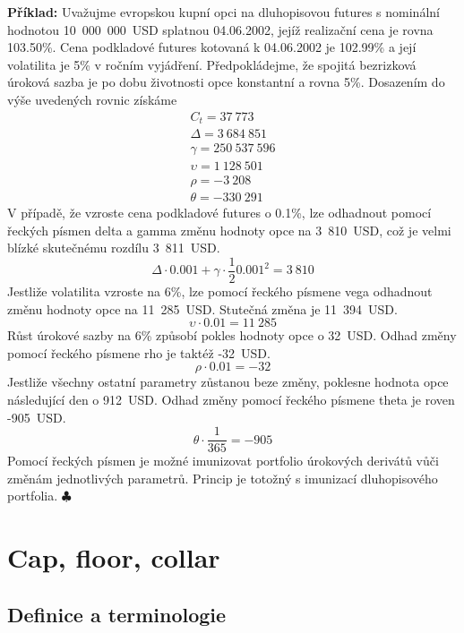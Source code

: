 \documentclass[a4paper]{book}
\begin{document}
\noindent \textbf{Příklad:} Uvažujme evropskou kupní opci na dluhopisovou futures s nominální hodnotou 10~000~000~USD splatnou 04.06.2002, jejíž realizační cena je rovna 103.50\%. Cena podkladové futures kotovaná k 04.06.2002 je 102.99\% a její volatilita je 5\% v ročním vyjádření. Předpokládejme, že spojitá bezrizková úroková sazba je po dobu životnosti opce konstantní a rovna 5\%. Dosazením do výše uvedených rovnic získáme
\begin{gather*}
C_t = 37~773\\
\Delta = 3~684~851\\
\gamma = 250~537~596\\
\upsilon = 1~128~501\\
\rho = -3~208\\
\theta = -330~291
\end{gather*}
V případě, že vzroste cena podkladové futures o 0.1\%, lze odhadnout pomocí řeckých písmen delta a gamma změnu hodnoty opce na 3~810~USD, což je velmi blízké skutečnému rozdílu 3~811~USD.
\begin{equation*}
\Delta \cdot 0.001 + \gamma \cdot \frac{1}{2} 0.001^2 = 3~810
\end{equation*}
Jestliže volatilita vzroste na 6\%, lze pomocí řeckého písmene vega odhadnout změnu hodnoty opce na 11~285~USD. Stutečná změna je 11~394~USD.
\begin{equation*}
\upsilon \cdot 0.01 = 11~285
\end{equation*}
Růst úrokové sazby na 6\% způsobí pokles hodnoty opce o 32~USD. Odhad změny pomocí řeckého písmene rho je taktéž -32~USD.
\begin{equation*}
\rho \cdot 0.01 = -32
\end{equation*}
Jestliže všechny ostatní parametry zůstanou beze změny, poklesne hodnota opce následující den o 912~USD. Odhad změny pomocí řeckého písmene theta je roven -905~USD.
\begin{equation*}
\theta \cdot \frac{1}{365} = -905
\end{equation*}
Pomocí řeckých písmen je možné imunizovat portfolio úrokových derivátů vůči změnám jednotlivých parametrů. Princip je totožný s imunizací dluhopisového portfolia. $\clubsuit$\\

\section{Cap, floor, collar}

\subsection{Definice a terminologie}
\end{document}
